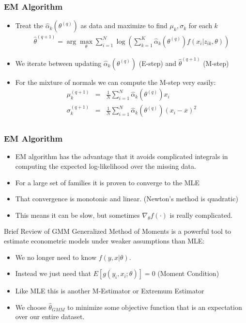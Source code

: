 \documentclass[aspectratio=169]{beamer}
\begin{document}
\begin{frame}
\frametitle{EM Algorithm}
\begin{itemize}
\item Treat the $\hat{\alpha}_k(\theta^{(q)})$ as data and maximize to find $\mu_k,\sigma_k$ for each $k$
\begin{eqnarray*}
\hat{\theta}^{(q+1)} = \arg \max_{\theta}  \sum_{i=1}^N  \log \left( \sum_{k=1}^K \hat{\alpha}_k(\theta^{(q)}) f(x_i | z_{ik}, \theta ) \right)
\end{eqnarray*}
\item We iterate between updating $\hat{\alpha}_k(\theta^{(q)})$ (E-step) and $\hat{\theta}^{(q+1)}$ (M-step)
\item For the mixture of normals we can compute the M-step very easily:
\begin{eqnarray*}
\mu_k^{(q+1)} &=& \frac{1}{N} \sum_{i=1}^N \hat{\alpha}_k(\theta^{(q)}) x_{i}\\
\sigma_k^{(q+1)} &=& \frac{1}{N} \sum_{i=1}^N \hat{\alpha}_k(\theta^{(q)}) (x_{i} - \overline{x})^2 \\
\end{eqnarray*}
\end{itemize}
\end{frame}

\begin{frame}
\frametitle{EM Algorithm}
\begin{itemize}
\item EM algorithm has the advantage that it avoids complicated integrals in computing the expected log-likelihood over the missing data.
\item For a large set of families it is proven to converge to the MLE
\item That convergence is \alert{monotonic} and \alert{linear}. (Newton's method is quadratic)
\item This means it can be slow, but sometimes $\nabla_{\theta} f (\cdot)$ is really complicated.
\end{itemize}
\end{frame}

\begin{frame}{Brief Review of GMM}
Generalized Method of Moments is a powerful tool to estimate econometric models under weaker assumptions than MLE:
\begin{itemize}
\item We no longer need to know $f(y,x | \theta)$.
\item Instead we just need that $E[g(y_i,x_i; \theta)]=0$ (\alert{Moment Condition})
\item Like MLE this is another \alert{M-Estimator} or \alert{Extremum Estimator}
\item We choose $\hat{\theta}_{GMM}$ to minimize some objective function that is an expectation over our entire dataset.
\end{itemize}
\end{frame}
\end{document}
